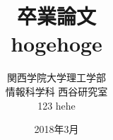 \title{卒業論文\\hogehoge}
\author{関西学院大学理工学部\\情報科学科 西谷研究室\\123 hehe}
\date{2018年3月}

\maketitle
\newpage
